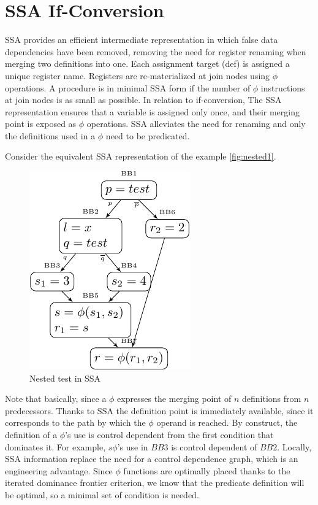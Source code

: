 \section{SSA If-Conversion}

SSA provides an efficient intermediate representation in which false data dependencies have been removed, removing the need for register renaming when merging two definitions into one. Each assignment target (def) is assigned a unique register name. Registers are re-materialized at join nodes using $\phi$ operations. A procedure is in minimal SSA form if the number of $\phi$ instructions at join nodes is as small as possible. In relation to if-conversion, The SSA representation ensures that a variable is assigned only once, and their merging point is exposed as $\phi$ operations. SSA alleviates the need for renaming and only the definitions used in a $\phi$ need to be predicated. 

Consider the equivalent SSA representation of the example \ref{fig:nested1}.

\begin{figure}
\centering
\includegraphics[scale=0.8]{nested4}
\caption{Nested test in SSA}
\label{fig:nest_ssa}
\end{figure}

Note that basically, since a $\phi$ expresses the merging point of $n$ definitions from $n$ predecessors. Thanks to SSA the definition point is immediately available, since it corresponds to the path by which the $\phi$ operand is reached. By construct, the definition of a $\phi$'s use is control dependent from the first condition that dominates it. For example, $s \phi$'s use in $BB3$ is control dependent of $BB2$. Locally, SSA information replace the need for a control dependence graph, which is an engineering advantage. Since $\phi$ functions are optimally placed thanks to the iterated dominance frontier criterion, we know that the predicate definition will be optimal, so a minimal set of condition is needed.


